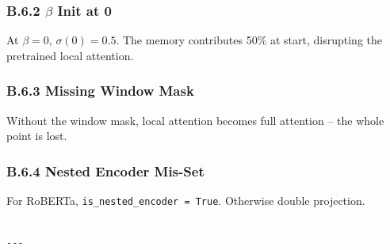 \subsubsection{B.6.2 $\beta$ Init at 0}

At $\beta = 0$, $\sigma(0) = 0.5$. The memory contributes 50\% at start, 
disrupting the pretrained local attention.

\subsubsection{B.6.3 Missing Window Mask}

Without the window mask, local attention becomes full attention -- the 
whole point is lost.

\subsubsection{B.6.4 Nested Encoder Mis-Set}

For RoBERTa, \texttt{is\_nested\_encoder = True}. Otherwise double projection.
\begin{lstlisting}

---
\end{lstlisting}